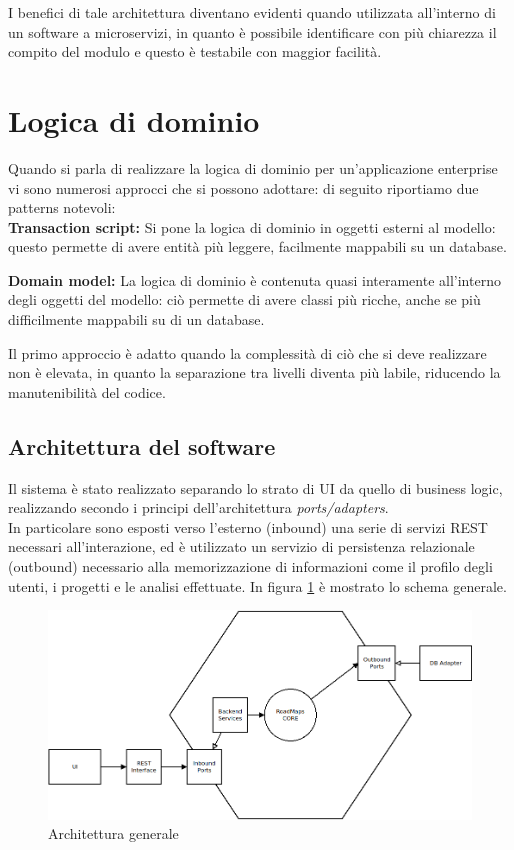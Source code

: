 I benefici di tale architettura diventano evidenti quando utilizzata all'interno di un software a microservizi, in quanto è possibile identificare con più chiarezza il compito del modulo e questo è testabile con maggior facilità.


\section{Logica di dominio}

Quando si parla di realizzare la logica di dominio per un'applicazione enterprise vi sono numerosi approcci che si possono adottare: di seguito riportiamo due patterns notevoli\cite{enterprise_app}:\\
\textbf{Transaction script:} Si pone la logica di dominio in oggetti esterni al modello: questo permette di avere entità più leggere, facilmente mappabili su un database.

\textbf{Domain model:} La logica di dominio è contenuta quasi interamente all'interno degli oggetti del modello: ciò permette di avere classi più ricche, anche se più difficilmente mappabili su di un database.

Il primo approccio è adatto quando la complessità di ciò che si deve realizzare non è elevata, in quanto la separazione tra livelli diventa più labile, riducendo la manutenibilità del codice.



\subsection{Architettura del software}
Il sistema è stato realizzato separando lo strato di UI da quello di business logic, realizzando secondo i principi dell'architettura \textit{ports/adapters}.\\
In particolare sono esposti verso l'esterno (inbound) una serie di servizi REST necessari all'interazione, ed è utilizzato un servizio di persistenza relazionale (outbound) necessario alla memorizzazione di informazioni come il profilo degli utenti, i progetti e le analisi effettuate.
In figura \ref{fig:architecture00} è mostrato lo schema generale.

\begin{figure}[h]
	\centering
	\includegraphics[width=\textwidth]{img/architecture00}
	\caption{Architettura generale}
	\label{fig:architecture00}
\end{figure}

